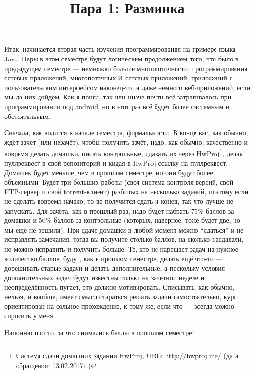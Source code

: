 \documentclass[a5paper]{article}
\title{Пара 1: Разминка}
\date{}
\begin{document}
\maketitle
\thispagestyle{empty}

Итак, начинается вторая часть изучения программирования на примере языка Java. Пары в этом семестре будут логическим продолжением того, что было в предыдущем семестре --- немножко больше многопоточности, программирования сетевых приложений, многопоточных И сетевых приложений, приложений с пользовательским интерфейсом наконец-то, и даже немного веб-приложений, если мы до них дойдём. Как я понял, так или иначе почти всё затрагивалось при программировании под android, но в этот раз всё будет более системным и обстоятельным.

Сначала, как водится в начале семестра, формальности. В конце вас, как обычно, ждёт зачёт (или незачёт), чтобы получить зачёт, надо, как обычно, качественно и вовремя делать домашки, писать контрольные, сдавать их через HwProj\footnote{Система сдачи домашних заданий HwProj, URL: \url{http://hwproj.me/} (дата обращения: 13.02.2017г.)}, делая пуллреквест в свой репозиторий и кидая в HwProj ссылку на пуллреквест. Домашек будет меньше, чем в прошлом семестре, но они будут более объёмными. Будет три больших работы (своя система контроля версий, свой FTP-сервер и свой torrent-клиент) разбитых на несколько заданий, поэтому если не сделать вовремя начало, то не получится сдать и конец, так что лучше не запускать. Для зачёта, как в прошлый раз, надо будет набрать 75\% баллов за домашки и 50\% баллов за контрольные (которых, наверное, тоже будет две, но мы ещё не решили). При сдаче домашки в любой момент можно ``сдаться'' и не исправлять замечания, тогда вы получите столько баллов, на сколько насдавали, но можно исправить и получить больше. Те, кто не нарешает задач на нужное количество баллов, будут, как в прошлом семестре, делать ещё что-то --- дорешивать старые задачи и делать дополнительные, а поскольку условия дополнительных задач будут известны только на зачётной неделе и неопределённость пугает, это должно мотивировать. Списывать, как обычно, нельзя, и вообще, имеет смысл стараться решать задачи самостоятельно, курс ориентирован на сольное прохождение, к тому же, если что --- всегда можно спросить у меня.

Напомню про то, за что снимались баллы в прошлом семестре:\nopagebreak
\end{document}
